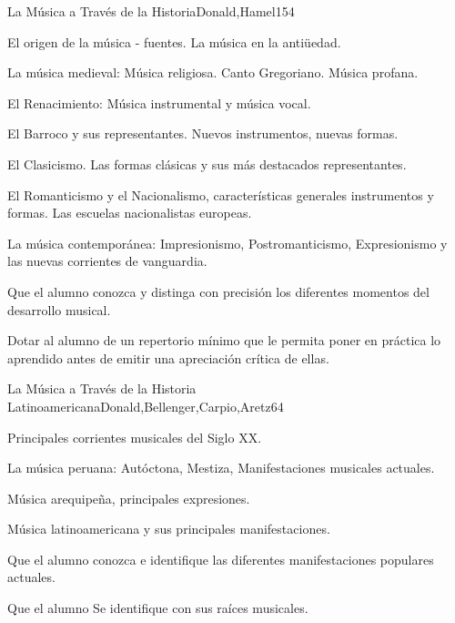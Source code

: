 \begin{syllabus}
\begin{unit}{La Música a Través de la Historia}{Donald,Hamel}{15}{4}
\begin{topics}
	\item El origen de la música - fuentes. La música en la antiüedad.
	\item La música medieval: Música religiosa.  Canto Gregoriano. Música profana.
	\item El Renacimiento: Música instrumental y música vocal.
	\item El Barroco y sus representantes. Nuevos instrumentos, nuevas formas.
	\item El Clasicismo. Las formas clásicas y sus más destacados representantes.
	\item El Romanticismo y el Nacionalismo, características generales instrumentos y formas. Las escuelas nacionalistas europeas.
	\item La música contemporánea: Impresionismo, Postromanticismo, Expresionismo y las nuevas corrientes de vanguardia.
\end{topics}
\begin{unitgoals}
	\item Que el alumno conozca y distinga con precisión los diferentes momentos del desarrollo musical.
	\item Dotar al alumno de un repertorio mínimo que le permita poner en práctica lo aprendido antes de emitir una apreciación crítica de ellas.
\end{unitgoals}
\end{unit}

\begin{unit}{La Música a Través de la Historia Latinoamericana}{Donald,Bellenger,Carpio,Aretz}{6}{4}
\begin{topics}
	\item Principales corrientes musicales del Siglo XX.
	\item La música peruana: Autóctona, Mestiza, Manifestaciones musicales actuales.
	\item Música arequipeña, principales expresiones.
	\item Música latinoamericana y sus principales manifestaciones.
\end{topics}
\begin{unitgoals}
	\item Que el alumno conozca e identifique las diferentes manifestaciones populares actuales. 
	\item Que el alumno Se identifique con sus raíces musicales.
\end{unitgoals}
\end{unit}



\begin{coursebibliography}
\end{coursebibliography}

\end{syllabus}
